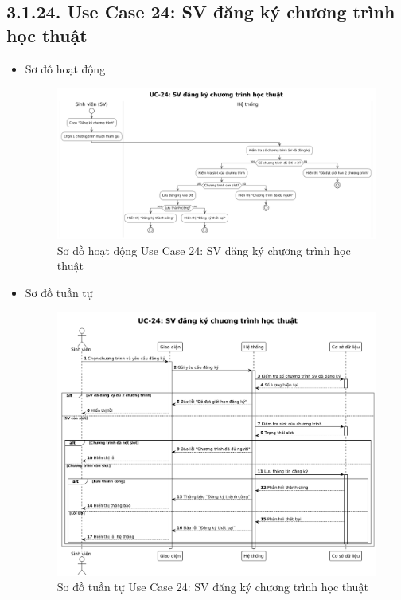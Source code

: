 \subsection*{3.1.24. Use Case 24: SV đăng ký chương trình học thuật}
\begin{itemize}
    \item Sơ đồ hoạt động
    \begin{figure}[H]
    \centering
    \includegraphics[scale=0.35 ]{Picture/ACUC24.png}
    \caption{Sơ đồ hoạt động Use Case 24: SV đăng ký chương trình học thuật}
    \end{figure}
    \item Sơ đồ tuần tự
    \begin{figure}[H]
    \centering
    \includegraphics[scale=0.35 ]{Picture/SEUC24.png}
    \caption{Sơ đồ tuần tự Use Case 24: SV đăng ký chương trình học thuật}
    \end{figure}
\end{itemize}
